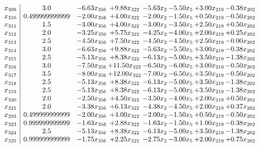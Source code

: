 \documentclass[8pt]{article}
\begin{document}
\[\begin{array}{c| c c@{\hskip 2pt} c@{\hskip 2pt} c@{\hskip 2pt} c@{\hskip 2pt} c@{\hskip 2pt} c@{\hskip 2pt} }
 x_{309}   &  3.0 & -6.63 x_{356} & +  9.88 x_{322} & -5.63 x_{2} & -5.50 x_{5} & +  3.00 x_{219} & -0.38 x_{202}\\
 x_{310}   &  0.499999999999 & -2.00 x_{356} & +  4.00 x_{322} & -2.00 x_{2} & -1.50 x_{5} & +  0.50 x_{219} & -0.50 x_{202}\\
 x_{311}   &  1.5 & -3.00 x_{356} & +  4.00 x_{322} & -3.00 x_{2} & -3.50 x_{5} & +  2.50 x_{219} & +  0.50 x_{202}\\
 x_{312}   &  2.0 & -3.25 x_{356} & +  5.75 x_{322} & -4.25 x_{2} & -4.00 x_{5} & +  2.00 x_{219} & +  0.25 x_{202}\\
 x_{313}   &  2.5 & -4.50 x_{356} & +  7.50 x_{322} & -4.50 x_{2} & -4.50 x_{5} & +  2.50 x_{219} & -0.00 x_{202}\\
 x_{314}   &  3.0 & -6.63 x_{356} & +  9.88 x_{322} & -5.63 x_{2} & -5.50 x_{5} & +  3.00 x_{219} & -0.38 x_{202}\\
 x_{315}   &  2.5 & -5.13 x_{356} & +  8.38 x_{322} & -6.13 x_{2} & -5.00 x_{5} & +  3.50 x_{219} & -1.38 x_{202}\\
 x_{316}   &  3.0 & -7.50 x_{356} & + 11.50 x_{322} & -6.50 x_{2} & -6.00 x_{5} & +  3.00 x_{219} & -0.50 x_{202}\\
 x_{317}   &  3.5 & -8.00 x_{356} & + 12.00 x_{322} & -7.00 x_{2} & -6.50 x_{5} & +  3.50 x_{219} & -0.50 x_{202}\\
 x_{318}   &  2.5 & -5.13 x_{356} & +  8.38 x_{322} & -6.13 x_{2} & -5.00 x_{5} & +  3.50 x_{219} & -1.38 x_{202}\\
 x_{319}   &  2.5 & -5.13 x_{356} & +  8.38 x_{322} & -6.13 x_{2} & -5.00 x_{5} & +  3.50 x_{219} & -1.38 x_{202}\\
 x_{320}   &  2.0 & -2.50 x_{356} & +  4.50 x_{322} & -3.50 x_{2} & -4.00 x_{5} & +  2.00 x_{219} & +  0.50 x_{202}\\
 x_{321}   &  2.0 & -3.38 x_{356} & +  6.13 x_{322} & -4.38 x_{2} & -4.50 x_{5} & +  2.00 x_{219} & +  0.37 x_{202}\\
 x_{293}   &  0.499999999999 & -2.00 x_{356} & +  4.00 x_{322} & -2.00 x_{2} & -1.50 x_{5} & +  0.50 x_{219} & -0.50 x_{202}\\
 x_{323}   &  0.999999999999 & -1.63 x_{356} & +  2.88 x_{322} & -1.63 x_{2} & -1.50 x_{5} & +  1.00 x_{219} & -0.38 x_{202}\\
 x_{324}   &  2.5 & -5.13 x_{356} & +  8.38 x_{322} & -6.13 x_{2} & -5.00 x_{5} & +  3.50 x_{219} & -1.38 x_{202}\\
 x_{325}   &  0.999999999999 & -1.75 x_{356} & +  2.25 x_{322} & -2.75 x_{2} & -3.00 x_{5} & +  2.00 x_{219} & +  0.75 x_{202}\\

\end{array}\]
\end{document}
